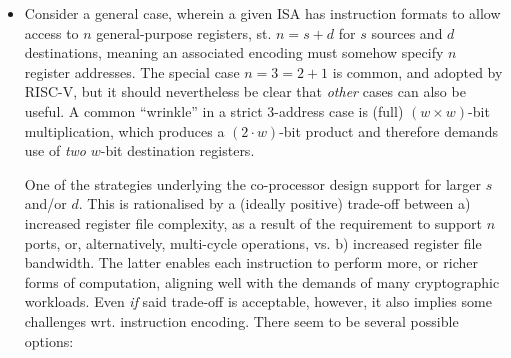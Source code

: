 \begin{itemize}
\item Consider a general case, wherein a given ISA has instruction formats
      to allow access to $n$ general-purpose registers, st. 
      $
      n = s + d
      $ 
      for $s$ sources and $d$ destinations, meaning an associated encoding 
      must somehow specify $n$ register addresses.  The special case
      $
      n = 3 = 2 + 1 
      $
      is common, and adopted by RISC-V, but it should nevertheless be clear
      that {\em other} cases can also be useful.  A common ``wrinkle'' in a 
      strict $3$-address case is (full) $( w \times w )$-bit multiplication, 
      which produces a $(2 \cdot w )$-bit product and therefore demands use 
      of {\em two} $w$-bit destination registers.
   
      One of the strategies underlying the co-processor design support for 
      larger $s$ and/or $d$.  This is rationalised by a (ideally positive) 
      trade-off between
      a) increased register file complexity, as a result of the requirement
         to support $n$ ports, or, alternatively, multi-cycle operations,
         vs.
      b) increased register file bandwidth.
      The latter enables each instruction to perform more, or richer forms 
      of computation, aligning well with the demands of many cryptographic 
      workloads.  Even {\em if} said trade-off is acceptable, however, it 
      also implies some challenges wrt. instruction encoding.  There seem
      to be several possible options:


\end{itemize}
